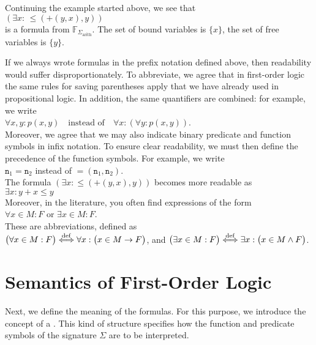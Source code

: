 \exampleEng
Continuing the example started above, we see that \\[0.2cm]
\hspace*{1.3cm} $(\exists x \colon\, \leq\!(\mathtt{+}(y, x),y))$ \\[0.2cm]
is a formula from $\mathbb{F}_{\Sigma_{\mathrm{arith}}}$. 
The set of bound variables is $\{x\}$, the set of free variables is 
$\{ y \}$. \eox

If we always wrote formulas in the prefix notation defined above, then readability would suffer
disproportionately.  
To abbreviate, we agree that in first-order logic the same rules for saving parentheses apply that we have
already used in propositional logic. In addition, the same quantifiers are combined: for example, we write   
\\[0.2cm]
\hspace*{1.3cm}
$\forall x, y \colon p(x, y)  \quad \text{instead of} \quad \forall x \colon ( \forall y \colon p(x,y))$.
\\[0.2cm]
Moreover, we agree that we may also indicate binary predicate and function symbols in infix notation.
To ensure clear readability, we must then define the precedence of the function symbols.
For example, we write \\[0.2cm]
\hspace*{1.3cm} $\mathtt{n}_1 = \mathtt{n}_2$  \quad instead of \quad $=(\mathtt{n}_1, \mathtt{n}_2)$. \\[0.2cm]
The formula $(\exists x \colon \leq(\mathtt{+}(y, x),y))$ becomes more readable as \\[0.2cm]
\hspace*{1.3cm} $\exists x \colon y + x \leq y$ \\[0.2cm]
Moreover, in the literature, you often find expressions of the form
\\[0.2cm]
\hspace*{1.3cm}
$\forall x \in M: F$ \quad or \quad $\exists x \in M: F$.
\\[0.2cm]
These are abbreviations, defined as
\\[0.2cm]
\hspace*{1.3cm}
$\displaystyle \bigl(\forall x \in M: F\bigr) \stackrel{\mathrm{def}}{\Longleftrightarrow} \forall x: \bigl(x \in M \rightarrow F\bigr)$,
\quad and \quad 
$\displaystyle\bigl(\exists x \in M: F\bigr) \stackrel{\mathrm{def}}{\Longleftrightarrow} \exists x: \bigl(x \in M \wedge F\bigr)$.

\section{Semantics of First-Order Logic \label{sec:semantik}}
Next, we define the meaning of the formulas. For this purpose, we introduce the concept of a
.  This kind of structure specifies how the
function and predicate symbols of the signature $\Sigma$ are to be interpreted.

